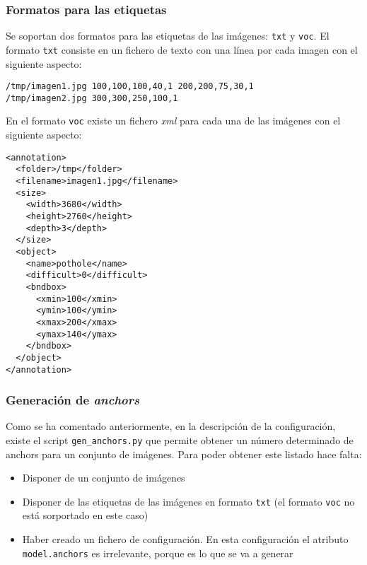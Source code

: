 \subsubsection*{Formatos para las etiquetas}

Se soportan dos formatos para las etiquetas de las imágenes: \texttt{txt} y \texttt{voc}. El formato \texttt{txt} consiste en un fichero de texto con una línea por cada imagen con el siguiente aspecto:

\begin{lstlisting}[frame=single, basicstyle=\ttfamily\footnotesize, caption={Ejemplo de fichero con las etiquetas en formato txt. La primera de las imágenes tiene 2 etiquetas, la primera está ubicada en la posición (100, 100) y tiene unas dimensiones de 100x40 píxeles. La segunda etiqueta está ubicada en la posición (200, 200) y tiene unas dimensiones de 75x30 píxeles. La segunda imagen tiene una única etiqueta ubicada en (300, 300) con dimensiones 250x100. Todas las etiquetas son de la clase 1}, captionpos=b]
/tmp/imagen1.jpg 100,100,100,40,1 200,200,75,30,1
/tmp/imagen2.jpg 300,300,250,100,1
\end{lstlisting}

En el formato \texttt{voc} existe un fichero \textit{xml} para cada una de las imágenes con el siguiente aspecto:

\begin{lstlisting}[frame=single, basicstyle=\ttfamily\footnotesize, caption={Ejemplo de fichero con las etiquetas en formato voc para una imagen}, captionpos=b]
<annotation>
  <folder>/tmp</folder>
  <filename>imagen1.jpg</filename>
  <size>
    <width>3680</width>
    <height>2760</height>
    <depth>3</depth>
  </size>
  <object>
    <name>pothole</name>
    <difficult>0</difficult>
    <bndbox>
      <xmin>100</xmin>
      <ymin>100</ymin>
      <xmax>200</xmax>
      <ymax>140</ymax>
    </bndbox>
  </object>
</annotation>
\end{lstlisting}

\subsubsection*{Generación de \textit{anchors}}

Como se ha comentado anteriormente, en la descripción de la configuración, existe el script \texttt{gen\_anchors.py} que permite obtener un número determinado de anchors para un conjunto de imágenes. Para poder obtener este listado hace falta:

\begin{itemize}
	\item Disponer de un conjunto de imágenes
	\item Disponer de las etiquetas de las imágenes en formato \texttt{txt} (el formato \texttt{voc} no está sorportado en este caso)
	\item Haber creado un fichero de configuración. En esta configuración el atributo \texttt{model.anchors} es irrelevante, porque es lo que se va a generar
\end{itemize}

